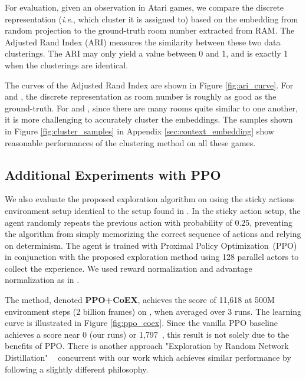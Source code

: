 \documentclass{article} \usepackage{iclr,times}
\makeatletter
\newcommand{\alert}[1]{{\color{red}{#1}}}
\newcommand{\coex}{{CoEX}}
\DeclareRobustCommand\onedot{\futurelet\@let@token\@onedot}
\def\onedot{.}
\def\ie{\emph{i.e}\onedot} \def\Ie{\emph{I.e}\onedot}
\makeatother
\begin{document}
{For evaluation, given an observation in Atari games,
we compare the discrete representation
(\ie, which cluster it is assigned to) based on the embedding from random projection
to the ground-truth room number extracted from RAM.
The Adjusted Rand Index (ARI) \citep{Rand:ARI} measures the similarity between these two data clusterings.
The ARI may only yield a value between 0 and 1, and is exactly 1 when the clusterings are identical.

The curves of the Adjusted Rand Index are shown in Figure \ref{fig:ari_curve}.
For \MontezumaRevenge and \Venture, the discrete representation as room number is roughly as good as the ground-truth.
For \Hero and \PrivateEye, since there are many rooms quite similar \iffalse with \fi {to one another,} it is more challenging to accurately cluster the embeddings.
The samples shown in Figure \ref{fig:cluster_samples} in Appendix \ref{sec:context_embedding}
show reasonable performances of the clustering method on all these games.













\vspace*{-3pt}
\subsection{Additional Experiments with PPO} \label{sec:ppo}
\vspace*{-5pt}

We also evaluate the proposed exploration algorithm on \MontezumaRevenge
using the sticky actions environment setup \citep{machado2017:revisiting}
identical to the setup found in \citep{ICLR2019:RND}.
In the sticky action setup, the agent randomly repeats the previous action with probability of 0.25,
preventing the algorithm from simply memorizing the correct sequence of actions and relying on determinism.
The agent is trained with Proximal Policy Optimization~(PPO)~\citep{schulman2017:proximal}
in conjunction with the proposed exploration method
using 128 parallel actors to collect the experience.
We used reward normalization and advantage normalization as in \citep{Burda:2018:Curiosity}.


The method, denoted {\bf PPO+\coex{}}, achieves the score of {11,618} at 500M environment steps (2 billion frames) on \MontezumaRevenge, when averaged over 3 runs.
The learning curve is illustrated in Figure \ref{fig:ppo_coex}.
\alert{}
Since the vanilla PPO baseline achieves a score near 0 (our runs) or 1,797~\citep{ICLR2019:RND},
this result is not solely due to the benefits of PPO.
There is another approach "Exploration by Random Network Distillation"
~\citep{ICLR2019:RND}
concurrent with our work which achieves similar performance by following a slightly different philosophy.



}
\end{document}

